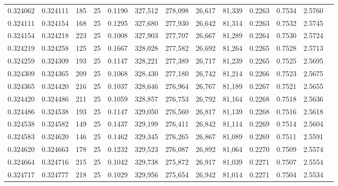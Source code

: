 \begin{tabular}{rrrrrrrrrrrrr}
0.324062 & 0.324111 &   185 &  25 &                                     0.1190 & 327,512 & 278,098 &  26,617 &  81,339 & 0.2263 & 0.7534 & 2.5760 \\
0.324111 & 0.324154 &   168 &  25 &                                     0.1295 & 327,680 & 277,930 &  26,642 &  81,314 & 0.2263 & 0.7532 & 2.5745 \\
0.324154 & 0.324218 &   223 &  25 &                                     0.1008 & 327,903 & 277,707 &  26,667 &  81,289 & 0.2264 & 0.7530 & 2.5724 \\
0.324219 & 0.324258 &   125 &  25 &                                     0.1667 & 328,028 & 277,582 &  26,692 &  81,264 & 0.2265 & 0.7528 & 2.5713 \\
0.324259 & 0.324309 &   193 &  25 &                                     0.1147 & 328,221 & 277,389 &  26,717 &  81,239 & 0.2265 & 0.7525 & 2.5695 \\
0.324309 & 0.324365 &   209 &  25 &                                     0.1068 & 328,430 & 277,180 &  26,742 &  81,214 & 0.2266 & 0.7523 & 2.5675 \\
0.324365 & 0.324420 &   216 &  25 &                                     0.1037 & 328,646 & 276,964 &  26,767 &  81,189 & 0.2267 & 0.7521 & 2.5655 \\
0.324420 & 0.324486 &   211 &  25 &                                     0.1059 & 328,857 & 276,753 &  26,792 &  81,164 & 0.2268 & 0.7518 & 2.5636 \\
0.324486 & 0.324538 &   193 &  25 &                                     0.1147 & 329,050 & 276,560 &  26,817 &  81,139 & 0.2268 & 0.7516 & 2.5618 \\
0.324538 & 0.324582 &   149 &  25 &                                     0.1437 & 329,199 & 276,411 &  26,842 &  81,114 & 0.2269 & 0.7514 & 2.5604 \\
0.324583 & 0.324620 &   146 &  25 &                                     0.1462 & 329,345 & 276,265 &  26,867 &  81,089 & 0.2269 & 0.7511 & 2.5591 \\
0.324620 & 0.324663 &   178 &  25 &                                     0.1232 & 329,523 & 276,087 &  26,892 &  81,064 & 0.2270 & 0.7509 & 2.5574 \\
0.324664 & 0.324716 &   215 &  25 &                                     0.1042 & 329,738 & 275,872 &  26,917 &  81,039 & 0.2271 & 0.7507 & 2.5554 \\
0.324717 & 0.324777 &   218 &  25 &                                     0.1029 & 329,956 & 275,654 &  26,942 &  81,014 & 0.2271 & 0.7504 & 2.5534 \\

\end{tabular}
